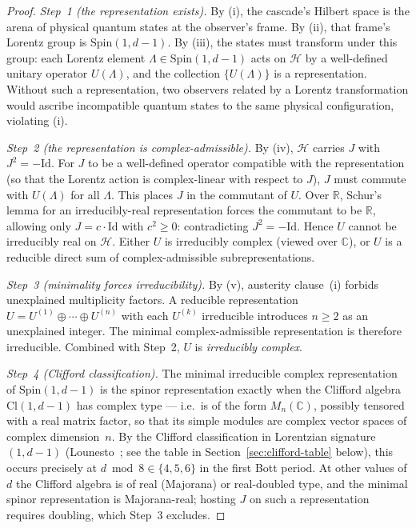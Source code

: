 \documentclass[12pt,a4paper]{article}
\begin{document}
\begin{proof}
\emph{Step~1 (the representation exists).}
By (i), the cascade's Hilbert space is the arena of physical quantum
states at the observer's frame. By (ii), that frame's Lorentz group is
$\mathrm{Spin}(1,d-1)$. By (iii), the states must transform under this
group: each Lorentz element $\Lambda \in \mathrm{Spin}(1,d-1)$ acts on
$\mathcal{H}$ by a well-defined unitary operator $U(\Lambda)$, and the
collection $\{U(\Lambda)\}$ is a representation. Without such a
representation, two observers related by a Lorentz transformation
would ascribe incompatible quantum states to the same physical
configuration, violating (i).

\emph{Step~2 (the representation is complex-admissible).}
By (iv), $\mathcal{H}$ carries $J$ with $J^2 = -\mathrm{Id}$. For $J$
to be a well-defined operator compatible with the representation (so
that the Lorentz action is complex-linear with respect to $J$), $J$
must commute with $U(\Lambda)$ for all $\Lambda$. This places $J$ in the
commutant of $U$. Over $\mathbb{R}$, Schur's lemma for an
irreducibly-real representation forces the commutant to be $\mathbb{R}$,
allowing only $J = c\cdot\mathrm{Id}$ with $c^2 \geq 0$: contradicting
$J^2 = -\mathrm{Id}$. Hence $U$ cannot be irreducibly real on
$\mathcal{H}$. Either $U$ is irreducibly complex (viewed over
$\mathbb{C}$), or $U$ is a reducible direct sum of complex-admissible
subrepresentations.

\emph{Step~3 (minimality forces irreducibility).}
By (v), austerity clause~(i) forbids unexplained multiplicity
factors. A reducible representation $U = U^{(1)} \oplus \cdots \oplus U^{(n)}$
with each $U^{(k)}$ irreducible introduces $n \geq 2$ as an unexplained
integer. The minimal complex-admissible representation is therefore
irreducible. Combined with Step~2, $U$ is \emph{irreducibly complex}.

\emph{Step~4 (Clifford classification).}
The minimal irreducible complex representation of $\mathrm{Spin}(1,d-1)$
is the spinor representation exactly when the Clifford algebra
$\mathrm{Cl}(1,d-1)$ has complex type --- i.e.\ is of the form
$M_n(\mathbb{C})$, possibly tensored with a real matrix factor, so that
its simple modules are complex vector spaces of complex dimension~$n$.
By the Clifford classification in Lorentzian signature $(1,d-1)$
(Lounesto~\cite{lounesto}; see the table in
Section~\ref{sec:clifford-table} below), this occurs precisely at
$d\bmod 8 \in \{4,5,6\}$ in the first Bott period. At other values of
$d$ the Clifford algebra is of real (Majorana) or real-doubled type,
and the minimal spinor representation is Majorana-real; hosting $J$ on
such a representation requires doubling, which Step~3 excludes.
\end{proof}
\end{document}
